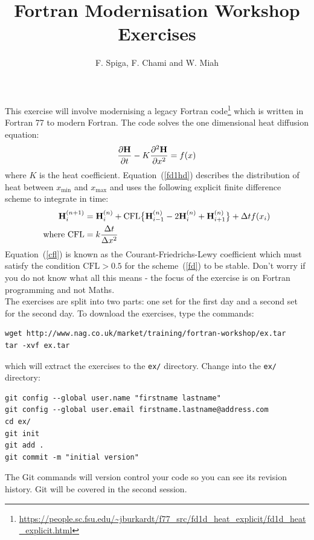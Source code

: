 \documentclass[12pt]{article}
\begin{document}
 
 
 
\title{\bf Fortran Modernisation Workshop \\ Exercises}
\author{F. Spiga, F. Chami and W. Miah}
 
\maketitle

This exercise will involve modernising a legacy Fortran code\footnote{\url{https://people.sc.fsu.edu/~jburkardt/f77_src/fd1d_heat_explicit/fd1d_heat_explicit.html}} which is written 
in Fortran 77 to modern Fortran. The code solves the one dimensional heat
diffusion equation:
\begin{equation} \label{fd1hd}
\frac{\partial{\bf H}}{\partial t} - K\frac{\partial^{2}{\bf H}}{\partial x^{2}} = f(x)
\end{equation}
where $K$ is the heat coefficient. Equation~(\ref{fd1hd}) describes the distribution of heat 
between $x_{\text{min}}$ and $x_{\text{max}}$ and uses the following explicit finite difference 
scheme to integrate in time:
\begin{align}
{\bf H}^{(n+1)}_{i} & = {\bf H}^{(n)}_{i} + \text{CFL}\big\{{\bf H}^{(n)}_{i-1}-2{\bf H}^{(n)}_{i} +
                      {\bf H}^{(n)}_{i+1}\big\} + \Delta t f(x_{i}) \label{fd} \\
            \text{where CFL} & = k\frac{\Delta t}{\Delta x^{2}} \label{cfl}
\end{align}
Equation~(\ref{cfl}) is known as the Courant-Friedrichs-Lewy coefficient which must satisfy
the condition $\text{CFL} > 0.5$ for the scheme~(\ref{fd}) to be stable. Don't worry if you do 
not know what all this means - the focus of the exercise is on Fortran programming and not
Maths. \\

The exercises are split into two parts: one set for the first day and a second
set for the second day. To download the exercises, type the commands:
\begin{verbatim}
wget http://www.nag.co.uk/market/training/fortran-workshop/ex.tar
tar -xvf ex.tar
\end{verbatim}
which will extract the exercises to the \texttt{ex/} directory. Change into the 
\texttt{ex/} directory:
\begin{verbatim}
git config --global user.name "firstname lastname"
git config --global user.email firstname.lastname@address.com
cd ex/
git init
git add .
git commit -m "initial version"
\end{verbatim}
The Git commands will version control your code so you can see its revision history. Git will
be covered in the second session. \\
\end{document}
